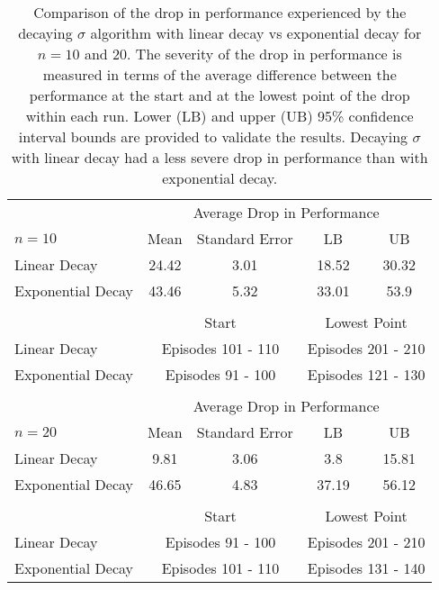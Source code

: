 \begin{table}[t] 
\caption[Comparison of the Drop in Performance Experienced by the Decaying $\sigma$ Algorithm with Linear Decay vs Exponential Decay for $n = 10$ and $20$]{Comparison of the drop in performance experienced by the decaying $\sigma$ algorithm with linear decay vs exponential decay for $n = 10$ and $20$. 
The severity of the drop in performance is measured in terms of the average difference between the performance at the start and at the lowest point of the drop within each run.
Lower (LB) and upper (UB) 95\% confidence interval bounds are provided to validate the results.
Decaying $\sigma$ with linear decay had a less severe drop in performance than with exponential decay.
}
\label{tbl:exp_vs_lin_decay2}
\begin{center}
\begin{tabular}{lcccc}
\toprule
& \multicolumn{4}{c}{Average Drop in Performance} \\
\cmidrule{2-5}
$n = 10$ & Mean & Standard Error & LB & UB \\
\midrule
Linear Decay 		& 24.42 & 3.01  & 18.52 & 30.32 \\
Exponential Decay   & 43.46 & 5.32  & 33.01 & 53.9  \\
&&&& \\
& \multicolumn{2}{c}{Start} & \multicolumn{2}{c}{Lowest Point}  \\
\cmidrule(l){2-3} \cmidrule(l){4-5}
Linear Decay        & \multicolumn{2}{c}{Episodes 101 - 110}   & \multicolumn{2}{c}{Episodes 201 - 210} \\
Exponential Decay   & \multicolumn{2}{c}{Episodes  91 - 100}   & \multicolumn{2}{c}{Episodes 121 - 130} \\
\bottomrule
&&&& \\
\toprule
& \multicolumn{4}{c}{Average Drop in Performance} \\
\cmidrule{2-5}
$n = 20$ & Mean & Standard Error & LB & UB \\
\midrule
Linear Decay 		& 9.81  & 3.06  & 3.8   & 15.81 \\
Exponential Decay   & 46.65 & 4.83  & 37.19 & 56.12 \\
&&&& \\
& \multicolumn{2}{c}{Start} & \multicolumn{2}{c}{Lowest Point}  \\
\cmidrule(l){2-3} \cmidrule(l){4-5}
Linear Decay        & \multicolumn{2}{c}{Episodes  91 - 100}   & \multicolumn{2}{c}{Episodes 201 - 210} \\
Exponential Decay   & \multicolumn{2}{c}{Episodes 101 - 110}   & \multicolumn{2}{c}{Episodes 131 - 140} \\
\bottomrule
\end{tabular}
\end{center}
\end{table}

